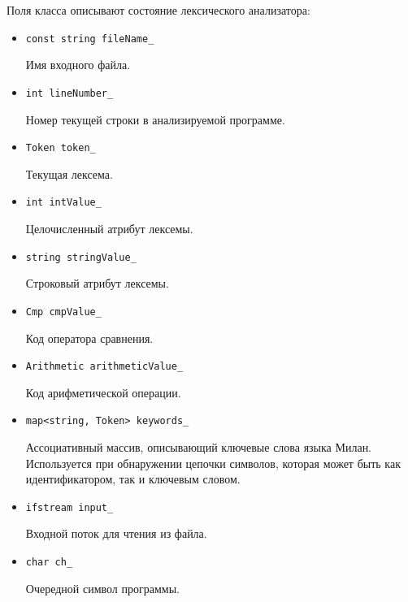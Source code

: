 \documentclass[a4paper,12pt]{article}
\begin{document}
Поля класса описывают состояние лексического анализатора:
\begin{itemize}
\item \texttt{const string fileName\_}

      Имя входного файла.

\item \texttt{int lineNumber\_}

      Номер текущей строки в анализируемой программе.

\item \texttt{Token token\_}

      Текущая лексема.

\item \texttt{int intValue\_}

      Целочисленный атрибут лексемы.

\item \texttt{string stringValue\_}

      Строковый атрибут лексемы.

\item \texttt{Cmp cmpValue\_}

      Код оператора сравнения.

\item \texttt{Arithmetic arithmeticValue\_}

      Код арифметической операции.

\item \texttt{map<string, Token> keywords\_}

      Ассоциативный массив, описывающий ключевые слова языка Милан. Используется
      при обнаружении цепочки символов, которая может быть как идентификатором,
      так и ключевым словом.

\item \texttt{ifstream input\_}

      Входной поток для чтения из файла.

\item \texttt{char ch\_}

      Очередной символ программы.
\end{itemize}
\end{document}

